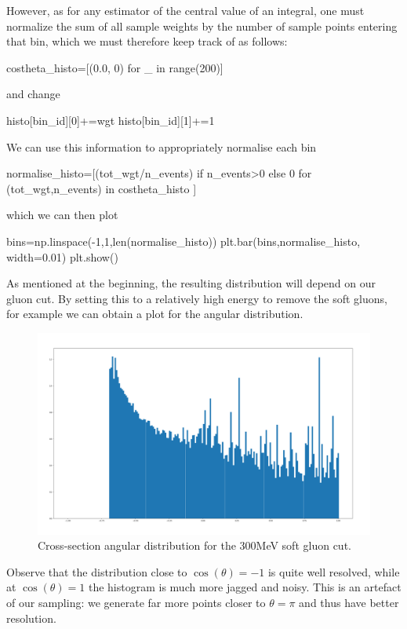 However, as for any estimator of the central value of an integral, one must normalize the sum of all sample weights by the number of sample points entering that bin, which we must therefore keep track of as follows:
\begin{codeenv}
        costheta_histo=[(0.0, 0) for _ in range(200)]
\end{codeenv}
and change 
            \begin{codeenv}
histo[bin_id][0]+=wgt
histo[bin_id][1]+=1
            \end{codeenv}
\color{black}
We can use this information to appropriately normalise each bin
\begin{codeenv}
        normalise_histo=[(tot_wgt/n_events) if n_events>0 
        else 0 for (tot_wgt,n_events) in costheta_histo ]
\end{codeenv}
which we can then plot
\begin{codeenv}
    bins=np.linspace(-1,1,len(normalise_histo))
    plt.bar(bins,normalise_histo, width=0.01)
    plt.show()
\end{codeenv}
As mentioned at the beginning, the resulting distribution will depend on our gluon cut. By setting this to a relatively high energy to remove the soft gluons, for example  we can obtain a plot for the angular distribution.
\begin{figure}[H]
    \centering
    \includegraphics[width=0.75\linewidth]{tex/ims/angular_dist.png}
    \caption{Cross-section angular distribution for the 300MeV soft gluon cut.}
    \label{fig:enter-label}
\end{figure}
Observe that the distribution close to $\cos(\theta)=-1$ is quite well resolved, while at $\cos(\theta)=1$ the histogram is much more jagged and noisy. This is an artefact of our sampling: we generate far more points closer to $\theta=\pi$ and thus have better resolution.

